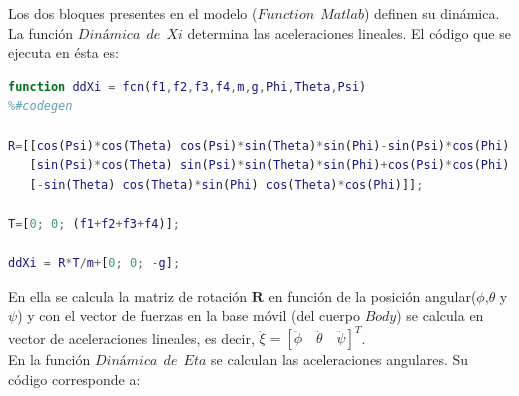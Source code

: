 \documentclass[twoside,11pt]{report}
\begin{document}
Los dos bloques presentes en el modelo ($Function \>\> Matlab$) definen su dinámica. La función $Dinámica \>\> de \>\> Xi$ determina las aceleraciones lineales. El código que se ejecuta en ésta es:\\


\begin{lstlisting}[language=Matlab]
function ddXi = fcn(f1,f2,f3,f4,m,g,Phi,Theta,Psi)
%#codegen

R=[[cos(Psi)*cos(Theta) cos(Psi)*sin(Theta)*sin(Phi)-sin(Psi)*cos(Phi) cos(Psi)*sin(Theta)*cos(Phi)+sin(Psi)*sin(Phi)];
   [sin(Psi)*cos(Theta) sin(Psi)*sin(Theta)*sin(Phi)+cos(Psi)*cos(Phi) sin(Psi)*sin(Theta)*cos(Phi)-cos(Psi)*sin(Phi)];
   [-sin(Theta) cos(Theta)*sin(Phi) cos(Theta)*cos(Phi)]];

T=[0; 0; (f1+f2+f3+f4)];

ddXi = R*T/m+[0; 0; -g];
\end{lstlisting}

En ella se calcula la matriz de rotación $\mathbf{R}$ en función de la posición angular($\phi$,$\theta$ y $\psi$) y con el vector de fuerzas en la base móvil (del cuerpo $Body$) se calcula en vector de aceleraciones lineales, es decir, $\ddot{\xi}=\left[ \ddot{\phi} \quad \ddot{\theta} \quad \ddot{\psi} \right]^{T}$. \\

En la función $Dinámica \>\> de \>\> Eta$ se calculan las aceleraciones angulares. Su código corresponde a: 
\end{document}
